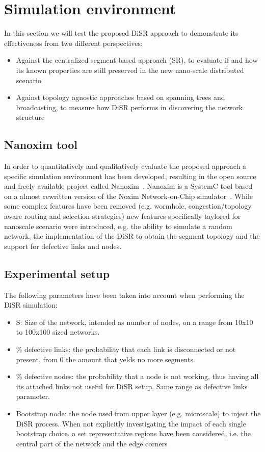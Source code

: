 
\section{Simulation environment}

In this section we will test the proposed DiSR approach to demonstrate
its effectiveness from two different perspectives:
\begin{itemize}
\item Against the centralized segment based approach (SR), to evaluate
if and how its known properties are still preserved in the new nano-scale distributed scenario
\item Against topology agnostic approaches based on spanning
trees and broadcasting, to measure how DiSR performs in discovering
the network structure 
\end{itemize}

\subsection{Nanoxim tool}

In order to quantitatively and qualitatively evaluate the proposed approach a
specific simulation environment has been developed, resulting in
the open source and freely available project called Nanoxim~\cite{}.
Nanoxim is a SystemC tool based on a almost rewritten
version of the Noxim Network-on-Chip simulator~\cite{}. While some
complex features have been removed (e.g. wormhole, congestion/topology
aware routing and selection strategies) new features specifically
taylored for nanoscale scenario were introduced, e.g. the ability to simulate a random
network, the implementation of the DiSR to obtain the segment topology
and the support for defective links and nodes.

\subsection{Experimental setup}
The following parameters have been taken into account when
performing the DiSR simulation:
\begin{itemize}
\item {S}: Size of the network, intended as number of nodes, on a
range from 10x10 to 100x100 sized networks. 
\item {\% defective links}: the probability that each link is
disconnected or not present, from 0 the amount that yelds
no more segments.
\item {\% defective nodes}: the probability that a node is not
working, thus having all its attached links not useful for DiSR setup.
Same range as defective links parameter.
\item {Bootstrap node}: the node used from upper layer (e.g. microscale)
to inject the DiSR process. When not explicitly investigating the
impact of each single bootstrap choice, a set representative regions have been
considered, i.e. the central part of the network and the edge corners
\end{itemize}

